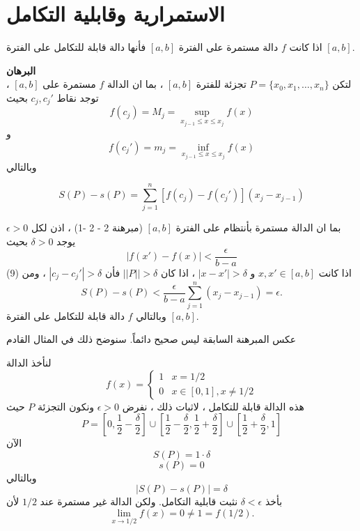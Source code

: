 \section[الاستمرارية وقابلية التكامل]{الاستمرارية وقابلية التكامل \cite{introrealanal}}

\begin{theorem}
	اذا كانت $f$ دالة مستمرة على الفترة $[a, b]$ فأنها دالة قابلة للتكامل على الفترة $[a, b]$.
\end{theorem}
\noindent
\textbf{البرهان}\\
\noindent
لتكن $P = \{ x_0 , x_1, \dots, x_n\}$ تجزئة للفترة $[a, b]$ ، بما ان الدالة $f$ مستمرة على $[a, b]$ ، توجد نقاط $c_j, c_j'$ بحيث
\[
f(c_j) = M_j = \sup_{x_{j-1}\leq x\leq x_j} f(x)
\]
و 
\[
f(c_j') = m_j = \inf_{x_{j-1}\leq x\leq x_j} f(x)
\]
وبالتالي

\begin{equation}
	S(P) - s(P) = \sum_{j=1}^{n} \left[f(c_j) - f(c_j')\right](x_j - x_{j-1})
\end{equation}

بما ان الدالة مستمرة بأنتظام على الفترة $[a, b]$ (مبرهنة 2 - 2 -1) ، اذن لكل $\epsilon > 0 $ يوجد $\delta > 0 $ بحيث
\[
|f(x') - f(x)| < \frac{\epsilon}{b-a}
\]
اذا كانت $x, x'\in [a, b]$ و $|x-x'| > \delta$ ، اذا كان $||P|| > \delta$ فأن $|c_j - c_j'| > \delta$ ، ومن (9) 
\[
S(P) - s(P) < \frac{\epsilon}{b-a} \sum_{j=1}^{n} (x_j - x_{j-1} ) =\epsilon.
\]
وبالتالي $f$ دالة قابلة للتكامل على الفترة $[a, b]$.

\begin{note}
	عكس المبرهنة السابقة ليس صحيح دائماً. سنوضح ذلك في المثال القادم
\end{note}

\begin{example}
	لنأخذ الدالة 
	\[
	f(x) = \begin{cases}
		1 & x=1/2 \\
		0 & x\in [0,1] ,x \neq 1/2
	\end{cases}
	\]
	هذه الدالة قابلة للتكامل ، لاثبات ذلك ، نفرض $\epsilon > 0 $ ونكون التجزئة $P$ حيث
	\[
	P = \left[0, \frac{1}{2} - \frac{\delta}{2} \right] \cup \left[\frac{1}{2} - \frac{\delta}{2}, \frac{1}{2} + \frac{\delta}{2}\right]  \cup \left[\frac{1}{2} + \frac{\delta}{2}, 1\right]
	\]
	الآن
	\[
	S(P ) = 1\cdot \delta
	\]
	\[
	s(P) = 0
	\]
	وبالتالي
	\[
	|S(P) - s(P)| = \delta
	\]
	بأخذ $\delta < \epsilon$ نثبت قابلية التكامل. ولكن الدالة غير مستمرة عند $1/2$ لأن	
\[
\lim\limits_{x\to 1/2} f(x) = 0 \neq 1 = f(1/2). 
\] 
\end{example}